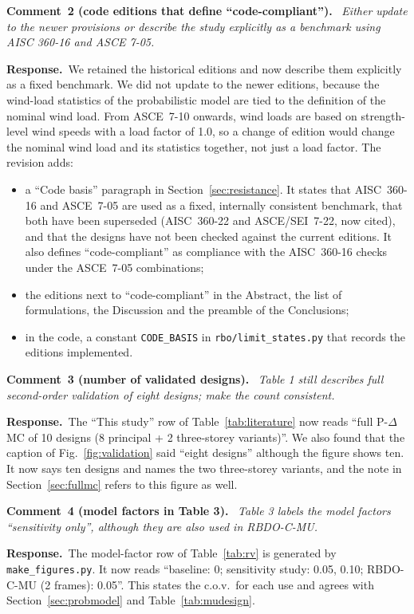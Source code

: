 \documentclass[11pt]{article}
\newenvironment{comment}[1]{\par\medskip\noindent\textbf{Comment~#1.}\ \itshape}{\par}
\newcommand{\resp}{\par\noindent\textbf{Response.}\ }
\begin{document}
\begin{comment}{2 (code editions that define ``code-compliant'')}
Either update to the newer provisions or describe the study explicitly as a benchmark using AISC 360-16
and ASCE 7-05.
\end{comment}
\resp We retained the historical editions and now describe them explicitly as a fixed benchmark. We
did not update to the newer editions, because the wind-load statistics of the probabilistic model are
tied to the definition of the nominal wind load. From ASCE~7-10 onwards, wind loads are based on
strength-level wind speeds with a load factor of 1.0, so a change of edition would change the
nominal wind load and its statistics together, not just a load factor. The revision adds:
\begin{itemize}[itemsep=0.1em]
\item a ``Code basis'' paragraph in Section~\ref{sec:resistance}. It states that AISC~360-16 and ASCE~7-05
are used as a fixed, internally consistent benchmark, that both have been superseded (AISC~360-22 and
ASCE/SEI~7-22, now cited), and that the designs have not been checked against the current editions.
It also defines ``code-compliant'' as compliance with the AISC~360-16 checks under the ASCE~7-05
combinations;
\item the editions next to ``code-compliant'' in the Abstract, the list of formulations, the
Discussion and the preamble of the Conclusions;
\item in the code, a constant \texttt{CODE\_BASIS} in \texttt{rbo/limit\_states.py} that records the
editions implemented.
\end{itemize}

\begin{comment}{3 (number of validated designs)}
Table 1 still describes full second-order validation of eight designs; make the count consistent.
\end{comment}
\resp The ``This study'' row of Table~\ref{tab:literature} now reads ``full P-$\Delta$ MC of 10 designs
(8 principal + 2 three-storey variants)''. We also found that the caption of
Fig.~\ref{fig:validation} said ``eight designs'' although the figure shows ten. It now says ten
designs and names the two three-storey variants, and the note in Section~\ref{sec:fullmc} refers to
this figure as well.

\begin{comment}{4 (model factors in Table 3)}
Table 3 labels the model factors ``sensitivity only'', although they are also used in RBDO-C-MU.
\end{comment}
\resp The model-factor row of Table~\ref{tab:rv} is generated by \texttt{make\_figures.py}. It now
reads ``baseline: 0; sensitivity study: 0.05, 0.10; RBDO-C-MU (2 frames): 0.05''. This states the
c.o.v.\ for each use and agrees with Section~\ref{sec:probmodel} and Table~\ref{tab:mudesign}.
\end{document}

